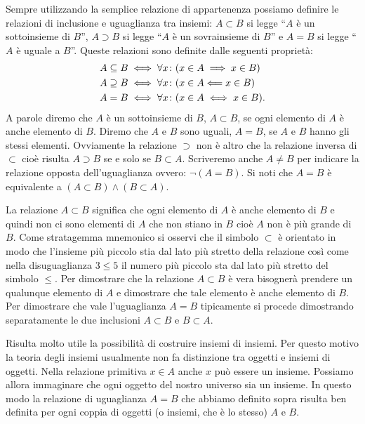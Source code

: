 Sempre utilizzando la semplice relazione di appartenenza possiamo definire
le relazioni di inclusione e uguaglianza tra insiemi:
$A \subset B$ si legge ``$A$ è un sottoinsieme di $B$'',
$A \supset B$ si legge ``$A$ è un sovrainsieme di $B$''
e $A=B$ si legge ``$A$ è uguale a $B$''. 
Queste relazioni sono definite dalle seguenti proprietà:
\begin{align*}
  A \subseteq B &\iff \forall x\colon (x\in A \implies x\in B)\\
  A \supseteq B &\iff \forall x\colon (x\in A \Longleftarrow x\in B)\\
  A = B &\iff \forall x\colon (x\in A \iff x \in B).
\end{align*}
A parole diremo che $A$ è un sottoinsieme di $B$, 
$A \subset B$, se ogni elemento di $A$ è anche elemento di $B$.
Diremo che $A$ e $B$ sono uguali, $A=B$, 
se $A$ e $B$ hanno gli stessi elementi.
Ovviamente la relazione $\supset$ non è altro 
che la relazione inversa di $\subset$ cioè risulta 
$A\supset B$ se e solo se $B\subset A$.
Scriveremo anche $A \neq B$ per indicare
la relazione opposta dell'uguaglianza ovvero: $\lnot(A=B)$.
Si noti che $A=B$ è equivalente a $(A\subset B) \land (B\subset A)$.

% 

La relazione $A \subset B$ significa che ogni elemento di $A$ 
è anche elemento di $B$ e quindi non ci sono elementi di $A$ che non stiano 
in $B$ cioè $A$ non è più grande di $B$. 
Come stratagemma mnemonico si osservi che il simbolo 
$\subset$ è orientato in modo che l'insieme più piccolo 
stia dal lato più stretto della relazione così come 
nella disuguaglianza $3 \le 5$ il numero più piccolo 
sta dal lato più stretto del simbolo $\le$.
Per dimostrare che la relazione $A \subset B$ è vera 
bisognerà prendere un qualunque elemento di $A$ e dimostrare 
che tale elemento è anche elemento di $B$.
Per dimostrare che vale l'uguaglianza $A=B$ tipicamente si procede 
dimostrando separatamente le due inclusioni $A\subset B$ e $B\subset A$.

Risulta molto utile la possibilità di costruire insiemi di insiemi.
Per questo motivo la teoria degli insiemi usualmente non fa distinzione
tra oggetti e insiemi di oggetti. Nella relazione primitiva $x\in A$ anche
$x$ può essere un insieme. Possiamo allora immaginare che ogni oggetto del
nostro universo sia un insieme. In questo modo la relazione di uguaglianza $A=B$
che abbiamo definito sopra risulta ben definita per ogni coppia di oggetti
(o insiemi, che è lo stesso) $A$ e $B$.

